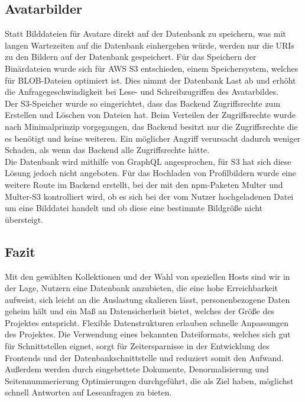 \subsection{Avatarbilder}
Statt Bilddateien für Avatare direkt auf der Datenbank zu speichern, was mit langen Wartezeiten auf die Datenbank einhergehen würde, werden nur die URIs zu den Bildern auf der Datenbank gespeichert. Für das Speichern der Binärdateien wurde sich für AWS S3 entschieden, einem Speichersystem, welches für BLOB-Dateien optimiert ist. Dies nimmt der Datenbank Last ab und erhöht die Anfragegeschwindigkeit bei Lese- und Schreibzugriffen des Avatarbildes.\\
Der S3-Speicher wurde so eingerichtet, dass das Backend Zugriffsrechte zum Erstellen und Löschen von Dateien hat. Beim Verteilen der Zugriffsrechte wurde nach Minimalprinzip vorgegangen, das Backend besitzt nur die Zugriffsrechte die es benötigt und keine weiteren. Ein möglicher Angriff verursacht dadurch weniger Schaden, als wenn das Backend alle Zugriffsrechte hätte.\\
Die Datenbank wird mithilfe von GraphQL angesprochen, für S3 hat sich diese Lösung jedoch nicht angeboten. Für das Hochladen von Profilbildern wurde eine weitere Route im Backend erstellt, bei der mit den npm-Paketen Multer und Multer-S3 kontrolliert wird, ob es sich bei der vom Nutzer hochgeladenen Datei um eine Bilddatei handelt und ob diese eine bestimmte Bildgröße nicht übersteigt.\\

\subsection{Fazit}
Mit den gewählten Kollektionen und der Wahl von speziellen Hosts sind wir in der Lage, Nutzern eine Datenbank anzubieten, die eine hohe Erreichbarkeit aufweist, sich leicht an die Auslastung skalieren lässt, personenbezogene Daten geheim hält und ein Maß an Datensicherheit bietet, welches der Größe des Projektes entspricht. Flexible Datenstrukturen erlauben schnelle Anpassungen des Projektes. Die Verwendung eines bekannten Dateiformats, welches sich gut für Schnittstellen eignet, sorgt für Zeitersparnisse in der Entwicklung des Frontends und der Datenbankschnittstelle und reduziert somit den Aufwand. Außerdem werden durch eingebettete Dokumente, Denormalisierung und Seitennummerierung Optimierungen durchgeführt, die als Ziel haben, möglichst schnell Antworten auf Leseanfragen zu bieten.